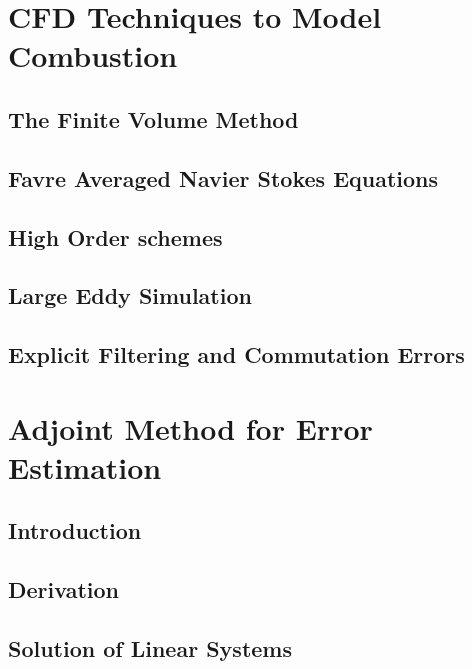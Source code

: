 \documentclass[titlepage,11pt,letterpaper]{article}
\begin{document}
\section{CFD Techniques to Model Combustion}

\subsection{The Finite Volume Method}
\subsection{Favre Averaged Navier Stokes Equations}
\subsection{High Order schemes}
\subsection{Large Eddy Simulation}
\subsection{Explicit Filtering and Commutation Errors}


\newpage
\section{Adjoint Method for Error Estimation}
\subsection{Introduction}
\subsection{Derivation}
\subsection{Solution of Linear Systems}


\newpage
\end{document}
